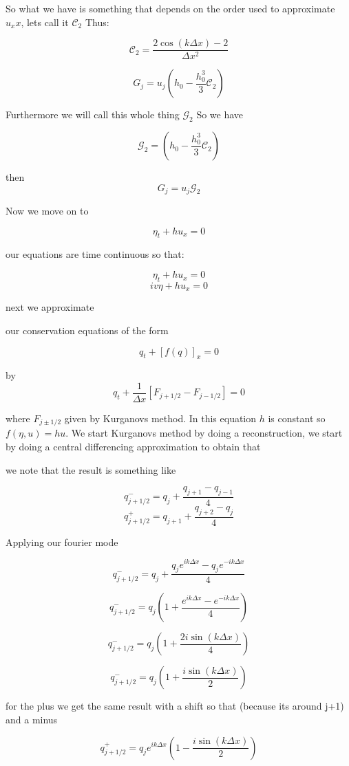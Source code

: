 \documentclass[12pt]{article}
\begin{document}
So what we have is something that depends on the order used to approximate $u_xx$, lets call it $\mathcal{C}_2$ Thus:

\[\mathcal{C}_2 = \dfrac{2\cos\left(k{\Delta x}\right) - 2}{\Delta x^2} \]

\[G_j = u_j \left( h_0 -  \frac{h_0^3}{3} \mathcal{C}_2 \right)\]

Furthermore we will call this whole thing $\mathcal{G}_2$ So we have

\[\mathcal{G}_2 = \left( h_0 -  \frac{h_0^3}{3} \mathcal{C}_2 \right)\]

then
\[G_j = u_j \mathcal{G}_2\]

Now we move on to 

\[\eta_t + h u_x = 0\]

our equations are time continuous so that:

\[\eta_t + h u_x = 0\]
\[iv\eta + h u_x = 0\]

next we approximate

our conservation equations of the form

\[q_t + \left[f(q)\right]_x = 0\]

by 
\[q_t + \frac{1}{\Delta x} \left[F_{j + 1/2} - F_{j - 1/2}\right]= 0\]

where $F_{j \pm 1/2}$ given by Kurganovs method. In this equation $h$ is constant so $f(\eta,u) = hu$. We start Kurganovs method by doing a reconstruction, we start by doing a central differencing approximation to obtain that

we note that the result is something like


\[q^-_{j + 1/2} = q_j + \frac{q_{j+1} - q_{j-1}}{4}\]
\[q^+_{j + 1/2} = q_{j+1} + \frac{q_{j+2} - q_{j}}{4}\]

Applying our fourier mode

\[q^-_{j + 1/2} = q_j + \frac{q_{j}e^{ik\Delta x} - q_{j}e^{-ik\Delta x}}{4}\]

\[q^-_{j + 1/2} = q_j\left(1  + \frac{e^{ik\Delta x} - e^{-ik\Delta x}}{4} \right)\]

\[q^-_{j + 1/2} = q_j\left(1  + \frac{2i\sin\left(k\Delta x\right)}{4} \right)\]

\[q^-_{j + 1/2} = q_j\left(1  + \frac{i\sin\left(k\Delta x\right)}{2} \right)\]

for the plus we get the same result with a shift so that (because its around j+1) and a minus

\[q^+_{j + 1/2} = q_j e^{ik\Delta x}\left(1  - \frac{i\sin\left(k\Delta x\right)}{2} \right)\]
\end{document}
